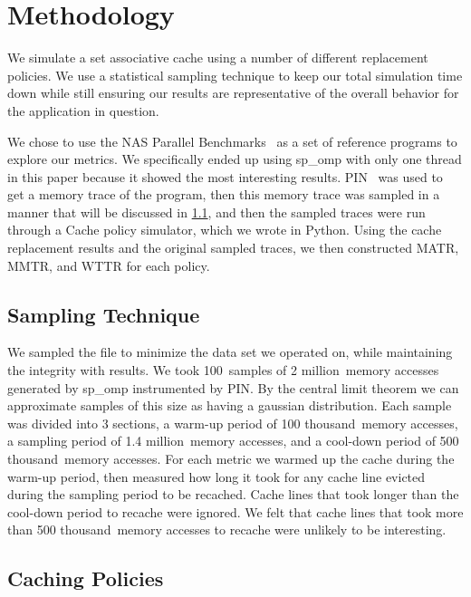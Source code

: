 \newcommand{\SAMPN}{100}
\newcommand{\SAMPK}{2 million}
\newcommand{\SAMP}{1.4 million}
\newcommand{\WARM}{100 thousand}
\newcommand{\COOL}{500 thousand}

\section{Methodology}
We simulate a set associative cache using a number of different
replacement policies.
We use a statistical sampling technique to keep our total simulation
time down while still ensuring our results are representative of the
overall behavior for the application in question.

We chose to use the NAS Parallel Benchmarks~\cite{bailey94} as a set of reference programs to explore our metrics.
We specifically ended up using sp\_omp with only one thread in this paper because it showed the most interesting results.
PIN~\cite{lukcohn05} was used to get a memory trace of the program,
 then this memory trace was sampled in a manner that will be discussed in \ref{sec:sampling},
 and then the sampled traces were run through a Cache policy simulator, which we wrote in Python.
Using the cache replacement results and the original sampled traces, we then constructed MATR, MMTR, and WTTR for each policy.

\subsection{Sampling Technique}
\label{sec:sampling}
We sampled the file to minimize the data set we operated on, while maintaining the integrity with results.
	We took \SAMPN~samples of \SAMPK~memory accesses generated by sp\_omp instrumented by PIN.
	By the central limit theorem we can approximate samples of this size as having a gaussian distribution.
	Each sample was divided into 3 sections, a warm-up period of \WARM~memory accesses,
		a sampling period of \SAMP~memory accesses, and a cool-down period of \COOL~memory accesses.
	For each metric we warmed up the cache during the warm-up period,
		then measured how long it took for any cache line evicted during the sampling period to be recached.
	Cache lines that took longer than the cool-down period to recache were ignored.
	We felt that cache lines that took more than \COOL~memory accesses to recache were unlikely to be interesting.

\subsection{Caching Policies}
\label{sec:policies}

